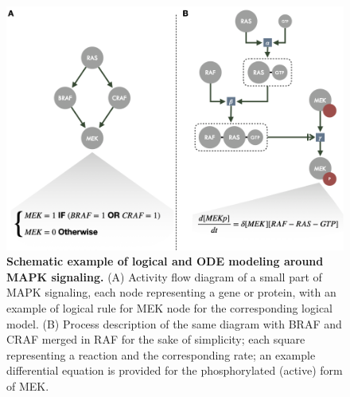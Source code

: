 \documentclass[a4paper,12pt,twoside,onecolumn,openright,final,oldfontcommands]{memoir}
\begin{document}
\begin{figure}

{\centering \includegraphics[width=0.9\linewidth]{fig/toyraf} 

}

\caption[Schematic example of logical and ODE modeling around MAPK signaling]{\textbf{Schematic example of logical and ODE
modeling around MAPK signaling.} (A) Activity flow diagram of a small
part of MAPK signaling, each node representing a gene or protein, with
an example of logical rule for MEK node for the corresponding logical
model. (B) Process description of the same diagram with BRAF and CRAF
merged in RAF for the sake of simplicity; each square representing a
reaction and the corresponding rate; an example differential equation is
provided for the phosphorylated (active) form of MEK.}\label{fig:toyraf}
\end{figure}
\end{document}
